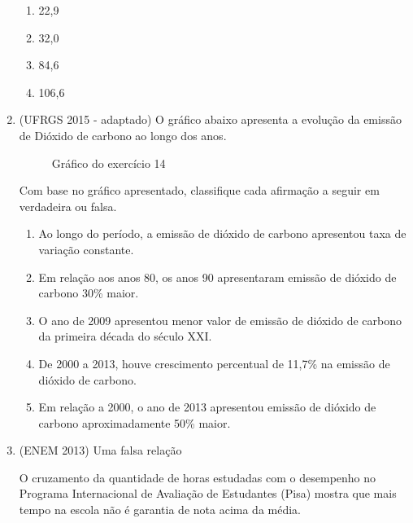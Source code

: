 \begin{enumerate}
\begin{enumerate}
\item {} 
22,9

\item {} 
32,0

\item {} 
84,6

\item {} 
106,6

\end{enumerate}

\item (UFRGS 2015 - adaptado)  O gráfico abaixo apresenta a evolução da emissão de Dióxido de carbono ao longo dos anos.

\begin{figure}[H]
\centering
\capstart

\noindent{}
\caption{Gráfico do exercício 14}\label{\detokenize{PE103-E:id7}}\label{\detokenize{PE103-E:id24}}\end{figure}

Com base no gráfico apresentado, classifique cada afirmação a seguir em verdadeira ou falsa.
\begin{enumerate}
\item {} 
Ao longo do período, a emissão de dióxido de carbono apresentou taxa de variação constante.

\item {} 
Em relação aos anos 80, os anos 90 apresentaram emissão de dióxido de carbono 30\% maior.

\item {} 
O ano de 2009 apresentou menor valor de emissão de dióxido de carbono da primeira década do século XXI.

\item {} 
De 2000 a 2013, houve crescimento percentual de 11,7\%  na emissão de dióxido de carbono.

\item {} 
Em relação a 2000, o ano de 2013 apresentou emissão de dióxido de carbono aproximadamente 50\%  maior.

\end{enumerate}

\item (ENEM 2013)  Uma falsa relação

O cruzamento da quantidade de horas estudadas com o desempenho no Programa Internacional de Avaliação de Estudantes (Pisa) mostra que mais tempo na escola não é garantia de nota acima da média.


\end{enumerate}
